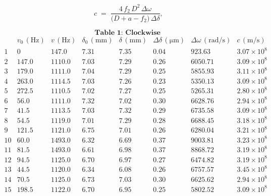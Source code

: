 \[
c 
\;=\; 
\frac{4\,f_{2}\,D^{2}\,\Delta\omega}
     {\bigl(D + a - f_{2}\bigr)\,\Delta \delta},
\]  



\[
\textbf{Table 1: Clockwise } 
\]
\[
\begin{array}{c|c|c|c|c|c|c|c}
\text{} 
& v_{0}\,(\text{Hz})
& v\,(\text{Hz})
& \delta_{0}\,(\mathrm{mm})
& \delta\,(\mathrm{mm})
& \Delta \delta\,(\mathrm{\mu m})
& \Delta \omega\,(\mathrm{rad/s})
& c\,(\mathrm{m/s})
\\ \hline
1 & 0 & 147.0 & 7.31 & 7.35 & 0.04 & 923.63 & 3.07\times10^{8} \\
2 & 147.0 & 1110.0 & 7.03 & 7.29 & 0.26 & 6050.71 & 3.09\times10^{8} \\
3 & 179.0 & 1111.0 & 7.04 & 7.29 & 0.25 & 5855.93 & 3.11\times10^{8} \\
4 & 263.0 & 1114.5 & 7.03 & 7.26 & 0.23 & 5350.13 & 3.09\times10^{8} \\
5 & 272.5 & 1110.5 & 7.02 & 7.27 & 0.25 & 5265.31 & 2.80\times10^{8} \\
6 & 56.0 & 1111.0 & 7.32 & 7.02 & 0.30 & 6628.76 & 2.94\times10^{8} \\
7 & 41.5 & 1113.5 & 7.03 & 7.32 & 0.29 & 6735.58 & 3.09\times10^{8} \\
8 & 54.5 & 1119.0 & 7.01 & 7.29 & 0.28 & 6688.45 & 3.18\times10^{8} \\
9 & 121.5 & 1121.0 & 6.75 & 7.01 & 0.26 & 6280.04 & 3.21\times10^{8} \\
10 & 60.0 & 1493.0 & 6.32 & 6.69 & 0.37 & 9003.81 & 3.23\times10^{8} \\
11 & 81.5 & 1493.0 & 6.61 & 6.98 & 0.37 & 8868.72 & 3.19\times10^{8} \\
12 & 94.5 & 1125.0 & 6.70 & 6.97 & 0.27 & 6474.82 & 3.19\times10^{8} \\
13 & 44.5 & 1120.0 & 6.34 & 6.08 & 0.26 & 6757.57 & 3.45\times10^{8} \\
14 & 70.5 & 1125.0 & 6.73 & 7.03 & 0.30 & 6625.62 & 2.94\times10^{8} \\
15 & 198.5 & 1122.0 & 6.70 & 6.95 & 0.25 & 5802.52 & 3.09\times10^{8} \\
\end{array}
\]

